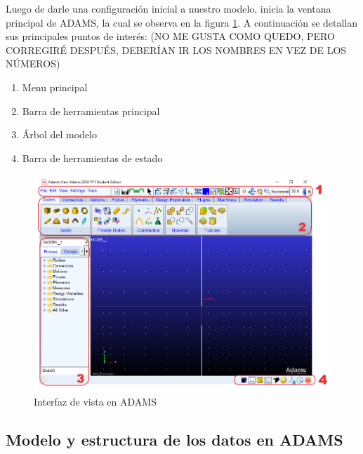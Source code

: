            Luego de darle una configuración inicial a nuestro modelo, inicia la ventana principal de ADAMS, la cual se observa en la figura \ref{f:Cap3-adams_window_GUI}. A continuación se detallan sus principales puntos de interés: (NO ME GUSTA COMO QUEDO, PERO CORREGIRÉ DESPUÉS, DEBERÍAN IR LOS NOMBRES EN VEZ DE LOS NÚMEROS)
            
            \begin{enumerate}
                \item Menu principal
                \item Barra de herramientas principal
                \item Árbol del modelo
                \item Barra de herramientas de estado
            \end{enumerate}
            
            \begin{figure}[H]
                \centering
                \includegraphics[width=1\linewidth]{Main/Chapter3/Images3/adams/interfaz_vista_adams.png}
                \caption{Interfaz de vista en ADAMS}
                \label{f:Cap3-adams_window_GUI}
            \end{figure} 
            
            
            
            
            
    \subsection{Modelo y estructura de los datos en ADAMS}
        
